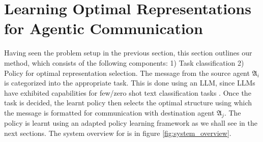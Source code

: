 \section{Learning Optimal Representations for Agentic Communication}

Having seen the problem setup in the previous section, this section outlines our method, \method which consists of the following components: 1) Task classification 2) Policy for optimal representation selection. The message from the source agent  $\mathfrak{A}_i$ is categorized into the appropriate task. This is done using an LLM, since LLMs have exhibited capabilities for few/zero shot text classification tasks \cite{brown2020languagemodelsfewshotlearners}. Once the task is decided, the learnt policy then selects the optimal structure using which the message is formatted for communication with destination agent $\mathfrak{A}_j$. The policy is learnt using an adapted policy learning framework as we shall see in the next sections. The system overview for \method is in figure \ref{fig:system_overview}.

